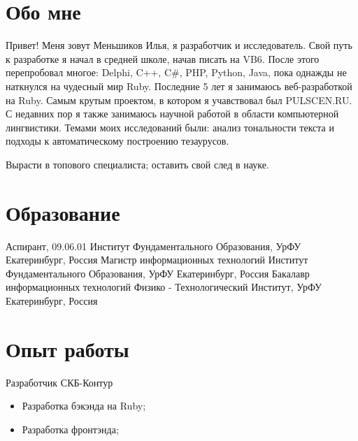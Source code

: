 \documentclass[11pt,a4paper]{moderncv}
\begin{document}
\maketitle

\section{Обо мне}
 {
  Привет! Меня зовут Меньшиков Илья, я разработчик и исследователь. Свой путь к разработке я начал в средней школе, начав писать на VB6. После этого перепробовал многое: Delphi, C++, C\#, PHP, Python, Java, пока однажды не наткнулся на чудесный мир Ruby.
}
\cvitem{} {
  Последние 5 лет я занимаюсь веб-разработкой на Ruby. Самым крутым проектом, в котором я учавствовал был PULSCEN.RU.
}
\cvitem{} {
  С недавних пор я также занимаюсь научной работой в области компьютерной лингвистики. Темами моих исследований были: анализ тональности текста и подходы к автоматическому построению тезаурусов.
}

 {
  Вырасти в топового специалиста; оставить свой след в науке.
}



\section{Образование}


  {Аспирант, 09.06.01}
  {Институт Фундаментального Образования, УрФУ}
  {Екатеринбург, Россия}
{}{}
  {Магистр информационных технологий}
  {Институт Фундаментального Образования, УрФУ}
  {Екатеринбург, Россия}
{}{}
  {Бакалавр информационных технологий}
  {Физико - Технологический Институт, УрФУ}
  {Екатеринбург, Россия}
{}{}

\section{Опыт работы}

  {Разработчик}{}
  {СКБ-Контур}
  {}
{
\begin{itemize}
  \item Разработка бэкэнда на Ruby;
  \item Разработка фронтэнда;
\end{itemize}
}
\end{document}
